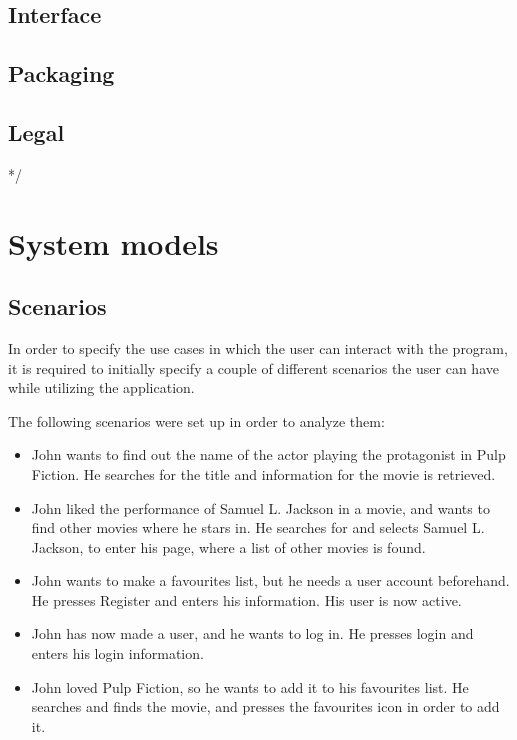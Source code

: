 \subsection{Interface}

\subsection{Packaging}

\subsection{Legal}
*/

\section{System models}

\subsection{Scenarios}
In order to specify the use cases in which the user can interact with the program, it is required to initially specify a couple of different scenarios the user can have while utilizing the application.

The following scenarios were set up in order to analyze them:

\begin{itemize}
	\setlength{\itemsep}{-5pt}
	
	\item John wants to find out the name of the actor playing the protagonist in Pulp Fiction. He searches for the title and information for the movie is retrieved.
	\item John liked the performance of Samuel L. Jackson in a movie, and wants to find other movies where he stars in. He searches for and selects Samuel L. Jackson, to enter his page, where a list of other movies is found.
	\item John wants to make a favourites list, but he needs a user account beforehand. He presses Register and enters his information. His user is now active.
	\item John has now made a user, and he wants to log in. He presses login and enters his login information.
	\item John loved Pulp Fiction, so he wants to add it to his favourites list. He searches and finds the movie, and presses the favourites icon in order to add it.
\end{itemize}

